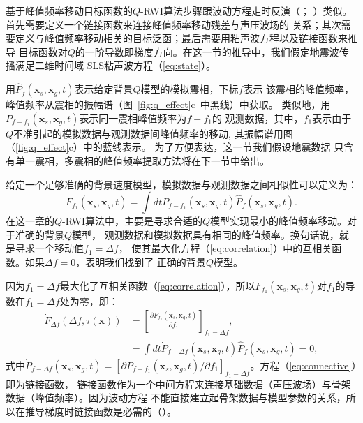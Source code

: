 基于峰值频率移动目标函数的$Q$-RWI算法步骤跟波动方程走时反演（；
）类似。首先需要定义一个链接函数来连接峰值频率移动残差与声压波场的
关系；其次需要定义与峰值频率移动相关的目标泛函；最后需要用粘声波方程以及链接函数来推导
目标函数对$Q$的一阶导数即梯度方向。在这一节的推导中，我们假定地震波传播满足二维时间域
SLS粘声波方程（\ref{eq:state}）。

用$\hat{P}_f(\mathbf{x}_s,\mathbf{x}_g,t)$表示给定背景$Q$模型的模拟震相，下标$f$表示
该震相的峰值频率，峰值频率从震相的振幅谱（图~\ref{fig:q_effect}c~中黑线）中获取。
类似地，用$P_{f-f_1}(\mathbf{x}_s,\mathbf{x}_g,t)$表示同一震相峰值频率为$f-f_1$的
观测数据，其中，$f_1$表示由于 
$Q$不准引起的模拟数据与观测数据间峰值频率的移动,
其振幅谱用图（\ref{fig:q_effect}c）中的蓝线表示。
为了方便表达，这一节我们假设地震数据
只含有单一震相，多震相的峰值频率提取方法将在下一节中给出。

给定一个足够准确的背景速度模型，模拟数据与观测数据之间相似性可以定义为：
\begin{equation}
	F_{f_1}(\mathbf{x}_s,\mathbf{x}_g,t)=\int dt P_{f-f_1}(\mathbf{x}_s,\mathbf{x}_g,t) 
	\hat{P}_f(\mathbf{x}_s,\mathbf{x}_g,t).
	\label{eq:correlation}
\end{equation}
在这一章的$Q$-RWI算法中，主要是寻求合适的$Q$模型实现最小的峰值频率移动。对于准确的背景$Q$模型，
观测数据和模拟数据具有相同的峰值频率。换句话说，就是寻求一个移动值$f_1=\Delta f$，
使其最大化方程（\ref{eq:correlation}）中的互相关函数。如果$\Delta f=0$，表明我们找到了
正确的背景$Q$模型。

因为$f_1=\Delta f$最大化了互相关函数（\ref{eq:correlation}），所以$F_{f_1}(\mathbf{x}_s,
\mathbf{x}_g,t)$对$f_1$的导数在$f_1=\Delta f$处为零，即：
\begin{equation}
	\begin{aligned}
		\dot{F}_{\Delta f}(\Delta f,\tau(\mathbf{x})) &=\left[\frac{\partial F_{f_1}
	(\mathbf{x}_s,\mathbf{x}_g,t)}{\partial f_1}\right]_{f_1=\Delta f}, \\
		&= \int dt \dot{P}_{f-\Delta f}(\mathbf{x}_s,\mathbf{x}_g,t)
	\hat{P}_f(\mathbf{x}_s,\mathbf{x}_g,t)=0,
	\label{eq:connective}
	\end{aligned}
\end{equation}
式中$\dot{P}_{f-\Delta f}(\mathbf{x}_s,\mathbf{x}_g,t)=[\partial P_{f-f_1}(\mathbf{x}_s,
\mathbf{x}_g,t)/\partial f_1]_{f_1=\Delta f}$。方程（\ref{eq:connective}）即为链接函数，
链接函数作为一个中间方程来连接基础数据（声压波场）与骨架数据（峰值频率）。因为波动方程
不能直接建立起骨架数据与模型参数的关系，所以在推导梯度时链接函数是必需的（）。

